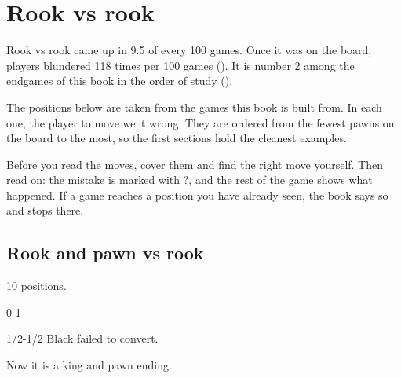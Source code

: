 \chapter{Rook vs rook}\label{ch:rook-endgames}
Rook vs rook came up in 9.5 of every 100 games. Once it was on the board, players blundered 118 times per 100 games (). It is number 2 among the endgames of this book in the order of study ().

The positions below are taken from the games this book is built from. In each one, the player to move went wrong. They are ordered from the fewest pawns on the board to the most, so the first sections hold the cleanest examples.

Before you read the moves, cover them and find the right move yourself. Then read on: the mistake is marked with ?, and the rest of the game shows what happened. If a game reaches a position you have already seen, the book says so and stops there.


\section{Rook and pawn vs rook}
10 positions.


0-1\par
{}

1/2-1/2 Black failed to convert.\par
{}

Now it is a king and pawn ending.\par
{}

